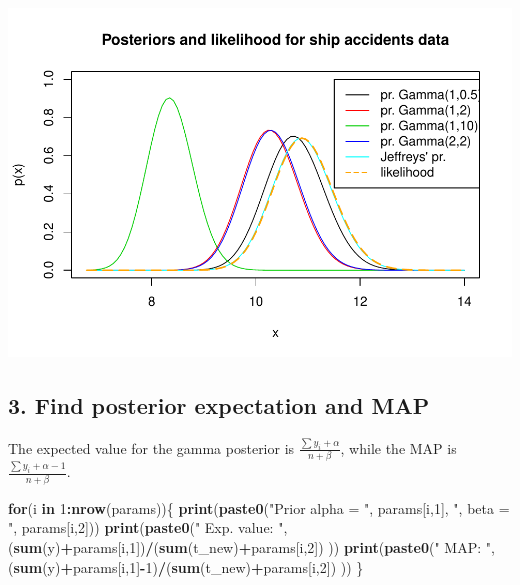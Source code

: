 \documentclass[]{article}
\newenvironment{Shaded}{\begin{snugshade}}{\end{snugshade}}
\newcommand{\KeywordTok}[1]{\textcolor[rgb]{0.13,0.29,0.53}{\textbf{#1}}}
\newcommand{\DecValTok}[1]{\textcolor[rgb]{0.00,0.00,0.81}{#1}}
\newcommand{\StringTok}[1]{\textcolor[rgb]{0.31,0.60,0.02}{#1}}
\newcommand{\ControlFlowTok}[1]{\textcolor[rgb]{0.13,0.29,0.53}{\textbf{#1}}}
\newcommand{\OperatorTok}[1]{\textcolor[rgb]{0.81,0.36,0.00}{\textbf{#1}}}
\newcommand{\NormalTok}[1]{#1}
\begin{document}
\includegraphics{ex01_files/figure-latex/unnamed-chunk-13-1.pdf}

\subsection{3. Find posterior expectation and
MAP}\label{find-posterior-expectation-and-map}

The expected value for the gamma posterior is
\(\frac{\sum y_i + \alpha}{n+\beta}\), while the MAP is
\(\frac{\sum y_i + \alpha-1}{n+\beta}\).

\begin{Shaded}
\begin{Highlighting}[]
\ControlFlowTok{for}\NormalTok{(i }\ControlFlowTok{in} \DecValTok{1}\OperatorTok{:}\KeywordTok{nrow}\NormalTok{(params))\{}
  \KeywordTok{print}\NormalTok{(}\KeywordTok{paste0}\NormalTok{(}\StringTok{"Prior alpha = "}\NormalTok{, params[i,}\DecValTok{1}\NormalTok{], }\StringTok{", beta = "}\NormalTok{, params[i,}\DecValTok{2}\NormalTok{]))}
  \KeywordTok{print}\NormalTok{(}\KeywordTok{paste0}\NormalTok{(}\StringTok{"    Exp. value: "}\NormalTok{, (}\KeywordTok{sum}\NormalTok{(y)}\OperatorTok{+}\NormalTok{params[i,}\DecValTok{1}\NormalTok{])}\OperatorTok{/}\NormalTok{(}\KeywordTok{sum}\NormalTok{(t_new)}\OperatorTok{+}\NormalTok{params[i,}\DecValTok{2}\NormalTok{]) ))}
  \KeywordTok{print}\NormalTok{(}\KeywordTok{paste0}\NormalTok{(}\StringTok{"    MAP: "}\NormalTok{, (}\KeywordTok{sum}\NormalTok{(y)}\OperatorTok{+}\NormalTok{params[i,}\DecValTok{1}\NormalTok{]}\OperatorTok{-}\DecValTok{1}\NormalTok{)}\OperatorTok{/}\NormalTok{(}\KeywordTok{sum}\NormalTok{(t_new)}\OperatorTok{+}\NormalTok{params[i,}\DecValTok{2}\NormalTok{]) ))}
\NormalTok{\}}
\end{Highlighting}
\end{Shaded}
\end{document}
